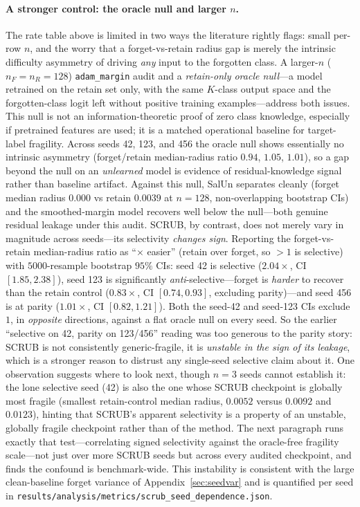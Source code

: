 \documentclass{article}
\begin{document}
\paragraph{A stronger control: the oracle null and larger $n$.} The rate table above is limited in two ways the literature rightly flags: small per-row $n$, and the worry that a forget-vs-retain radius gap is merely the intrinsic difficulty asymmetry of driving \emph{any} input to the forgotten class. A larger-$n$ ($n_F = n_R = 128$) \texttt{adam\_margin} audit and a \emph{retain-only oracle null}---a model retrained on the retain set only, with the same $K$-class output space and the forgotten-class logit left without positive training examples---address both issues. This null is not an information-theoretic proof of zero class knowledge, especially if pretrained features are used; it is a matched operational baseline for target-label fragility. Across seeds 42, 123, and 456 the oracle null shows essentially no intrinsic asymmetry (forget/retain median-radius ratio $0.94$, $1.05$, $1.01$), so a gap beyond the null on an \emph{unlearned} model is evidence of residual-knowledge signal rather than baseline artifact. Against this null, SalUn separates cleanly (forget median radius $0.000$ vs retain $0.0039$ at $n{=}128$, non-overlapping bootstrap CIs) and the smoothed-margin model recovers well below the null---both genuine residual leakage under this audit. SCRUB, by contrast, does not merely vary in magnitude across seeds---its selectivity \emph{changes sign}. Reporting the forget-vs-retain median-radius ratio as ``$\times$ easier'' (retain over forget, so $>1$ is selective) with $5000$-resample bootstrap $95\%$ CIs: seed 42 is selective ($2.04\times$, CI $[1.85,2.38]$), seed 123 is significantly \emph{anti}-selective---forget is \emph{harder} to recover than the retain control ($0.83\times$, CI $[0.74,0.93]$, excluding parity)---and seed 456 is at parity ($1.01\times$, CI $[0.82,1.21]$). Both the seed-42 and seed-123 CIs exclude $1$, in \emph{opposite} directions, against a flat oracle null on every seed. So the earlier ``selective on 42, parity on 123/456'' reading was too generous to the parity story: SCRUB is not consistently generic-fragile, it is \emph{unstable in the sign of its leakage}, which is a stronger reason to distrust any single-seed selective claim about it. One observation suggests where to look next, though $n=3$ seeds cannot establish it: the lone selective seed (42) is also the one whose SCRUB checkpoint is globally most fragile (smallest retain-control median radius, $0.0052$ versus $0.0092$ and $0.0123$), hinting that SCRUB's apparent selectivity is a property of an unstable, globally fragile checkpoint rather than of the method. The next paragraph runs exactly that test---correlating signed selectivity against the oracle-free fragility scale---not just over more SCRUB seeds but across every audited checkpoint, and finds the confound is benchmark-wide. This instability is consistent with the large clean-baseline forget variance of Appendix~\ref{sec:seedvar} and is quantified per seed in \texttt{results/analysis/metrics/scrub\_seed\_dependence.json}.
\end{document}
